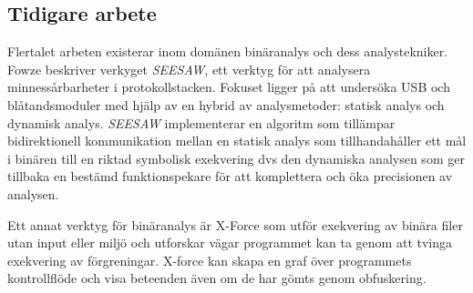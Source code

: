 \subsection{Tidigare arbete}
Flertalet arbeten existerar inom domänen binäranalys och dess analystekniker. Fowze \cite{fowze_mem_vul}
beskriver verkyget \emph{SEESAW}, ett verktyg för att analysera
minnessårbarheter i protokollstacken. Fokuset ligger på att undersöka USB och
blåtandsmoduler med hjälp av en hybrid av analysmetoder: statisk analys och
dynamisk analys. \emph{SEESAW} implementerar en algoritm som tillämpar
bidirektionell kommunikation mellan en statisk analys som tillhandahåller ett
mål i binären till en riktad symbolisk exekvering dvs den dynamiska analysen som
ger tillbaka en bestämd funktionspekare för att komplettera och öka precisionen
av analysen.  

Ett annat verktyg för binäranalys är X-Force som utför exekvering av binära 
filer utan input eller miljö och utforskar vägar programmet kan ta genom att 
tvinga exekvering av förgreningar\cite{xforce}. X-force kan skapa en graf över 
programmets kontrollflöde och visa beteenden även om de har gömts genom
obfuskering.
